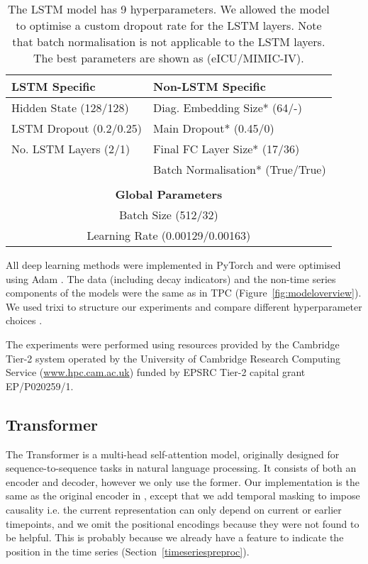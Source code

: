 \documentclass[sigconf]{acmart}
\begin{document}
\begin{table}
  \caption{The LSTM model has 9 hyperparameters. We allowed the model to optimise a custom dropout rate for the LSTM layers. Note that batch normalisation is not applicable to the LSTM layers. The best parameters are shown as (eICU/MIMIC-IV).}
  \label{tab:LSTMhyperparams}
  \centering
  \begin{tabular}{ll}
    \toprule
    \textbf{LSTM Specific} & \textbf{Non-LSTM Specific}\\
    \midrule
    Hidden State (128/128)&Diag. Embedding Size* (64/-)\\
    LSTM Dropout (0.2/0.25)&Main Dropout* (0.45/0)\\
    No. LSTM Layers (2/1)&Final FC Layer Size* (17/36)\\
    &Batch Normalisation* (True/True)\\
    \vspace{-0.8em}\\
    \toprule
    \multicolumn{2}{c}{\textbf{Global Parameters}}\\
    \midrule
    \multicolumn{2}{c}{Batch Size (512/32)}\\
    \multicolumn{2}{c}{Learning Rate (0.00129/0.00163)}\\
    \bottomrule
  \end{tabular}
\end{table}

All deep learning methods were implemented in PyTorch \citep{NEURIPS2019_9015} and were optimised using Adam \citep{KingmaB14}. The data (including decay indicators) and the non-time series components of the models were the same as in TPC (Figure~\ref{fig:modeloverview}). We used trixi to structure our experiments and compare different hyperparameter choices \citep{trixi2017}. 

The experiments were performed using resources provided by the Cambridge Tier-2 system operated by the University of Cambridge Research Computing Service (\url{www.hpc.cam.ac.uk}) funded by EPSRC Tier-2 capital grant EP/P020259/1.

\subsection{Transformer}
\label{transformer}

The Transformer is a multi-head self-attention model, originally designed for sequence-to-sequence tasks in natural language processing. It consists of both an encoder and decoder, however we only use the former. Our implementation is the same as the original encoder in \citet{46201}, except that we add temporal masking to impose causality i.e. the current representation can only depend on current or earlier timepoints, and we omit the positional encodings because they were not found to be helpful. This is probably because we already have a feature to indicate the position in the time series (Section~\ref{timeseriespreproc}).
\end{document}
